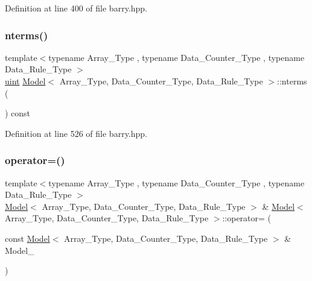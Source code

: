 Definition at line 400 of file barry.\+hpp.

\mbox{\label{classbarry_1_1_model_ad2a8b05a7d53289a8fc2e315739acdf9}} 
\subsubsection{\texorpdfstring{nterms()}{nterms()}}
{\footnotesize\ttfamily template$<$typename Array\+\_\+\+Type , typename Data\+\_\+\+Counter\+\_\+\+Type , typename Data\+\_\+\+Rule\+\_\+\+Type $>$ \\
\hyperlink{namespacebarry_a11dfc53ddb4672278319aa04f1e09a6c}{uint} \hyperlink{classbarry_1_1_model}{Model}$<$ Array\+\_\+\+Type, Data\+\_\+\+Counter\+\_\+\+Type, Data\+\_\+\+Rule\+\_\+\+Type $>$\+::nterms (\begin{DoxyParamCaption}{ }\end{DoxyParamCaption}) const\hspace{0.3cm}{\ttfamily [inline]}}



Definition at line 526 of file barry.\+hpp.

\mbox{\label{classbarry_1_1_model_a4944b5918dc4a9a59f72587da1e6bb3a}} 
\subsubsection{\texorpdfstring{operator=()}{operator=()}}
{\footnotesize\ttfamily template$<$typename Array\+\_\+\+Type , typename Data\+\_\+\+Counter\+\_\+\+Type , typename Data\+\_\+\+Rule\+\_\+\+Type $>$ \\
\hyperlink{classbarry_1_1_model}{Model}$<$ Array\+\_\+\+Type, Data\+\_\+\+Counter\+\_\+\+Type, Data\+\_\+\+Rule\+\_\+\+Type $>$ \& \hyperlink{classbarry_1_1_model}{Model}$<$ Array\+\_\+\+Type, Data\+\_\+\+Counter\+\_\+\+Type, Data\+\_\+\+Rule\+\_\+\+Type $>$\+::operator= (\begin{DoxyParamCaption}\item[{const \hyperlink{classbarry_1_1_model}{Model}$<$ Array\+\_\+\+Type, Data\+\_\+\+Counter\+\_\+\+Type, Data\+\_\+\+Rule\+\_\+\+Type $>$ \&}]{Model\+\_\+ }\end{DoxyParamCaption})\hspace{0.3cm}{\ttfamily [inline]}}



